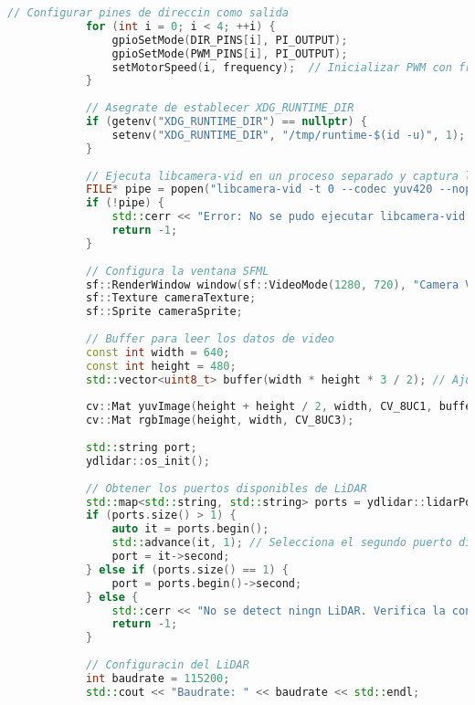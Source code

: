 \begin{lstlisting}[language={C++}, caption={Quinto ajuste de c\'odigo}, label={QuintoAjuste}]
            // Configurar pines de direccin como salida
            for (int i = 0; i < 4; ++i) {
                gpioSetMode(DIR_PINS[i], PI_OUTPUT);
                gpioSetMode(PWM_PINS[i], PI_OUTPUT);
                setMotorSpeed(i, frequency);  // Inicializar PWM con frecuencia inicial
            }
        
            // Asegrate de establecer XDG_RUNTIME_DIR
            if (getenv("XDG_RUNTIME_DIR") == nullptr) {
                setenv("XDG_RUNTIME_DIR", "/tmp/runtime-$(id -u)", 1);
            }
        
            // Ejecuta libcamera-vid en un proceso separado y captura la salida en YUV, sin previsualizacn
            FILE* pipe = popen("libcamera-vid -t 0 --codec yuv420 --nopreview -o -", "r");
            if (!pipe) {
                std::cerr << "Error: No se pudo ejecutar libcamera-vid." << std::endl;
                return -1;
            }
        
            // Configura la ventana SFML
            sf::RenderWindow window(sf::VideoMode(1280, 720), "Camera Visualization with LiDAR");
            sf::Texture cameraTexture;
            sf::Sprite cameraSprite;
        
            // Buffer para leer los datos de video
            const int width = 640;
            const int height = 480;
            std::vector<uint8_t> buffer(width * height * 3 / 2); // Ajusta el tamao del buffer para YUV420
        
            cv::Mat yuvImage(height + height / 2, width, CV_8UC1, buffer.data());
            cv::Mat rgbImage(height, width, CV_8UC3);
        
            std::string port;
            ydlidar::os_init();
        
            // Obtener los puertos disponibles de LiDAR
            std::map<std::string, std::string> ports = ydlidar::lidarPortList();
            if (ports.size() > 1) {
                auto it = ports.begin();
                std::advance(it, 1); // Selecciona el segundo puerto disponible
                port = it->second;
            } else if (ports.size() == 1) {
                port = ports.begin()->second;
            } else {
                std::cerr << "No se detect ningn LiDAR. Verifica la conexin." << std::endl;
                return -1;
            }
        
            // Configuracin del LiDAR
            int baudrate = 115200;
            std::cout << "Baudrate: " << baudrate << std::endl;
        

\end{lstlisting}
